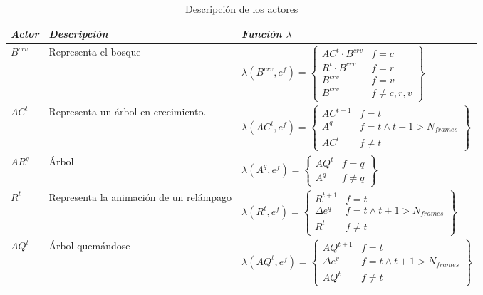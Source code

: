 \documentclass{egpubl}
\begin{document}
\begin{table}[h]
\begin{center}
\begin{small}
\begin{tabular}{|p{0.6cm}|p{1.5cm}|p{4.1cm}|}

	\hline
	\itshape Actor &
	\itshape Descripci\'on &
	\itshape Funci\'on $\lambda$ \\

	\hline
	$B^{crv}$ &
	Representa el bosque &
	$\lambda (B^{crv}, e^{f})=\left\{
	\begin{matrix}
		AC^{t} \cdot B^{crv} & f = c \\
		R^{t} \cdot B^{crv} & f = r \\
		B^{crv} & f = v	\\
		B^{crv} & f \neq c, r, v
	\end{matrix}\right\}$ \\

	\hline
	$AC^{t}$ &
	Representa un \'arbol en crecimiento. &
	$\lambda (AC^{t}, e^{f}) = \left\{
	\begin{matrix}
		AC^{t+1}  &  f = t \\
		A^{q} & f = t \wedge t + 1 > N_{frames} \\
		AC^{t} & f \neq	t
	 \end{matrix}\right\}$ \\

	\hline
	$AR^{q}$ &
	\'Arbol &
	$\lambda (A^{q}, e^{f}) = \left\{
	\begin{matrix}
		AQ^{t}	& f = q \\
		A^{q} & f \neq q
	\end{matrix}\right\}$ \\
	
	\hline
	$R^{t}$ &
	Representa la animaci\'on de un rel\'ampago &
	$\lambda (R^{t}, e^{f}) = \left\{
	\begin{matrix}
		R^{t + 1} & f = t \\
		\Delta e^{q}  & f = t \wedge t + 1 > N_{frames} \\
		R^{t}  & f \neq t
	\end{matrix}\right\}$ \\

	\hline
	$AQ^{t}$ &
	\'Arbol quem\'andose &
	$\lambda (AQ^{t}, e^{f}) = \left\{
	\begin{matrix}
		AQ^{t + 1}  & f = t \\
		\Delta e^{v}  & f = t \wedge t + 1 > N_{frames} \\
		AQ^{t}  & f \neq t 
	\end{matrix}\right\}$ \\

	\hline

\end{tabular}
\end{small}
\caption{\label{table3} Descripci\'on de los actores}
\end{center}
\end{table}
\end{document}
